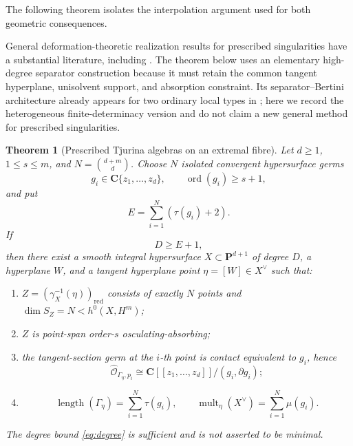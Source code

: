 \documentclass[11pt]{article}
\newtheorem{theorem}{Theorem}[section]
\theoremstyle{remark}
\newcommand{\PP}{\mathbf P}
\newcommand{\cO}{\mathcal O}
\newcommand{\length}{\operatorname{length}}
\begin{document}
The following theorem isolates the interpolation argument used for both
geometric consequences.

General deformation-theoretic realization results for prescribed
singularities have a substantial literature, including
\cite{GreuelKarras1989}.  The theorem below uses an elementary
high-degree separator construction because it must retain the common
tangent hyperplane, unisolvent support, and absorption constraint.
Its separator--Bertini architecture already appears for two ordinary local
types in \cite{ErikssonGauss2026}; here we record the heterogeneous
finite-determinacy version and do not claim a new general method for
prescribed singularities.

\begin{theorem}[Prescribed Tjurina algebras on an extremal fibre]
\label{thm:prescribe}
Let \(d\ge1\), \(1\le s\le m\), and
\(N=\binom{d+m}{d}\).  Choose \(N\) isolated convergent hypersurface germs
\[
 g_i\in\mathbf C\{z_1,\ldots,z_d\},
 \qquad \operatorname{ord}(g_i)\ge s+1,
\]
and put
\[
 E=\sum_{i=1}^N(\tau(g_i)+2).
\]
If
\begin{equation}\label{eq:degree}
 D\ge E+1,
\end{equation}
then there exist a smooth integral hypersurface
\(X\subset\PP^{d+1}\) of degree \(D\), a hyperplane \(W\), and a tangent
hyperplane point \(\eta=[W]\in X^\vee\) such that:
\begin{enumerate}[label=(\roman*)]
\item \(Z=(\gamma_X^{-1}(\eta))_{\mathrm{red}}\) consists of exactly \(N\)
points and \(\dim S_Z=N<h^0(X,H^m)\);
\item \(Z\) is point-span order-\(s\) osculating-absorbing;
\item the tangent-section germ at the \(i\)-th point is contact equivalent
to \(g_i\), hence
\[
 \widehat{\cO}_{\Gamma_\eta,p_i}
 \cong\mathbf C[[z_1,\ldots,z_d]]/(g_i,\partial g_i);
\]
\item
\[
 \length(\Gamma_\eta)=\sum_{i=1}^N\tau(g_i),
 \qquad
 \operatorname{mult}_{\eta}(X^\vee)=\sum_{i=1}^N\mu(g_i).
\]
\end{enumerate}
The degree bound \eqref{eq:degree} is sufficient and is not asserted to be
minimal.
\end{theorem}
\end{document}
